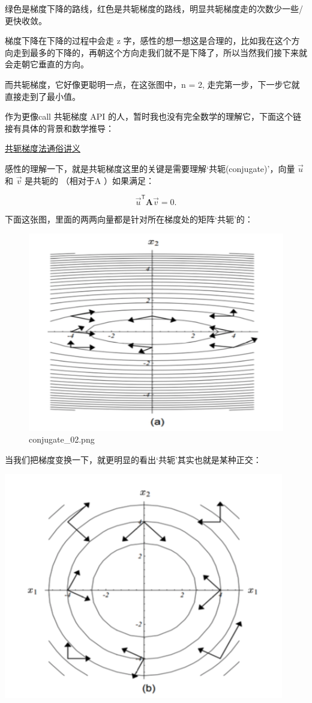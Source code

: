 \documentclass[
]{book}
\begin{document}
绿色是梯度下降的路线，红色是共轭梯度的路线，明显共轭梯度走的次数少一些/更快收敛。

梯度下降在下降的过程中会走 z 字，感性的想一想这是合理的，比如我在这个方向走到最多的下降的，再朝这个方向走我们就不是下降了，所以当然我们接下来就会走朝它垂直的方向。

而共轭梯度，它好像更聪明一点，在这张图中，n = 2, 走完第一步，下一步它就直接走到了最小值。

作为更像call 共轭梯度 API 的人，暂时我也没有完全数学的理解它，下面这个链接有具体的背景和数学推导：

\href{https://flat2010.github.io/2018/10/26/共轭梯度法通俗讲义/}{共轭梯度法通俗讲义}

感性的理解一下，就是共轭梯度这里的关键是需要理解`共轭(conjugate)'，向量 \(\vec{u}\) 和 \(\vec{v}\) 是共轭的 （相对于A ）如果满足：

\[
\vec{u} ^{\mathsf {T}}\mathbf {A} \vec {v} =0.
\]

下面这张图，里面的两两向量都是针对所在梯度处的矩阵`共轭'的：

\begin{figure}
\centering
\includegraphics{images/conjugate_02.png}
\caption{conjugate\_02.png}
\end{figure}

当我们把梯度变换一下，就更明显的看出`共轭'其实也就是某种正交：

\includegraphics{images/conjugate_01.png}
\end{document}
